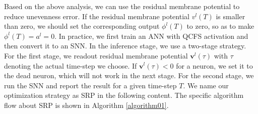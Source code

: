 \documentclass[letterpaper]{article} %
\begin{document}
 
Based on the above analysis, we can use the residual membrane potential to reduce unevenness error. If the residual membrane potential ${v}^l(T)$ is smaller than zero, we should set the corresponding output $\phi^l(T)$ to zero, so as to make $\phi^l(T)={a}^l=0$.
In practice, we first train an ANN with QCFS activation and then convert it to an SNN. In the inference stage, we use a two-stage strategy. For the first stage, we readout residual membrane potential  $\boldsymbol{v}^l(\tau)$ with $\tau$ denoting the actual time-step we choose.
If $\boldsymbol{v}^l(\tau)<0$ for a neuron, we set it to the dead neuron, which will not work in the next stage.
For the second stage, we run the SNN and report the result for a given time-step $T$.
 We name our optimization strategy as SRP in the following content. The specific algorithm flow about SRP is shown in Algorithm \ref{algorithm01}.
\end{document}

